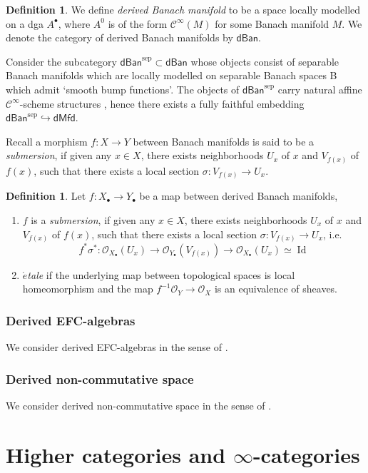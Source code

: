 \documentclass[12pt]{amsart}
\theoremstyle{definition}
\newtheorem{defn}[thm]{Definition}
\theoremstyle{remark}
\numberwithin{equation}{section}
\newcommand{\CO}{{\mathcal O}}
\newcommand{\cinf}{{\mathcal C}^{\infty}}
\newcommand{\1}{{\mathbb{1}}}
\newcommand{\dmfd}{\mathsf{dMfd}}
\newcommand{\dban}{\mathsf{dBan}}
\newcommand{\bt}{\bullet}
\newcommand{\id}{\operatorname{Id}}
\newcommand{\sep}{{\operatorname{sep}}}
\begin{document}
\begin{defn}
    We define {\it derived Banach manifold} to be a space locally modelled on a dga $A^{\bt}$, where  $A^0$ is of the form $\cinf{(M)}$ for some Banach manifold $M$. We denote the category of derived Banach manifolds by $\dban$. 
\end{defn}
Consider the subcategory $\dban^{\sep} \subset \dban$ whose objects consist of separable Banach manifolds which are locally modelled on separable Banach spaces B which admit ‘smooth bump functions’. The objects of $\dban^{\sep}$ carry natural affine $\cinf$-scheme structures \cite[Example 4.44]{Joy19}, hence there exists a fully faithful embedding $\dban^{\sep}\hookrightarrow \dmfd$.

Recall a morphism $f:X\to Y$ between Banach manifolds is said to be a {\it submersion}, if given any $x\in X$, there exists neighborhoods $U_x$ of $x$ and $V_{f(x)}$ of $f(x)$, such that there exists a local section $\sigma: V_{f(x)}\to U_x$.

\begin{defn}
    Let $f:X_{\bt} \to Y_{\bt}$ be a map between derived Banach manifolds, 
    \begin{enumerate}
        \item $f$ is a {\it submersion}, if given any $x\in X$, there exists neighborhoods $U_x$ of $x$ and $V_{f(x)}$ of $f(x)$, such that there exists a local section $\sigma: V_{f(x)}\to U_x$, i.e. 
        $$f^*\sigma^*:\CO_{X_{\bt}}(U_x)\to \CO_{Y_{\bt}}(V_{f(x)}) \to \CO_{X_{\bt}}(U_x)\simeq {\id}
        $$
        	\item {\it $\acute{e}$tale} if the underlying map between topological spaces is local homeomorphism and the map $f^{-1}\CO_Y\to \CO_X$ is an equivalence of sheaves.
    \end{enumerate}
\end{defn}


\subsubsection{Derived EFC-algebras}
We consider derived EFC-algebras in the sense of \cite{Pri20c}.
\subsubsection{Derived non-commutative space}
We consider derived non-commutative space in the sense of \cite{Pri20b}.


\section{Higher categories and $\infty$-categories}
\end{document}
